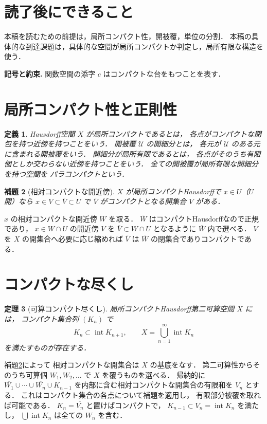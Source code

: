 \documentclass[a5paper,10pt,onecolumn]{jsarticle}
\makeatletter
\theoremstyle{mathnotetheorem}
\newtheorem{theorem}{定理}[section]
\newtheorem{definition}[theorem]{定義}
\newtheorem{lemma}[theorem]{補題}
\renewcommand{\proofname}{証明}
\renewenvironment{proof}[1][\proofname]{%
  \par\pushQED{\qed}\normalfont\topsep4\p@\@plus2\p@\relax
  \trivlist\item[\hskip\labelsep\bfseries #1]\ignorespaces
}{\popQED\endtrivlist\@endpefalse}
\makeatother
\begin{document}
\section*{読了後にできること}
本稿を読むための前提は，局所コンパクト性，開被覆，単位の分割．
本稿の具体的な到達課題は，具体的な空間が局所コンパクトか判定し，局所有限な構造を使う．



\par\noindent\textbf{記号と約束.}\quad
関数空間の添字 $c$ はコンパクトな台をもつことを表す．
\par

\section{局所コンパクト性と正則性}
\begin{definition}
Hausdorff空間 $X$ が局所コンパクトであるとは，
各点がコンパクトな閉包を持つ近傍を持つことをいう．
開被覆 $\mathcal U$ の開細分とは，
各元が $\mathcal U$ のある元に含まれる開被覆をいう．
開細分が局所有限であるとは，
各点がそのうち有限個としか交わらない近傍を持つことをいう．
全ての開被覆が局所有限な開細分を持つ空間を
パラコンパクトという．
\end{definition}
\begin{lemma}[相対コンパクトな開近傍]\label{lem:relcompact}
$X$ が局所コンパクトHausdorffで
$x\in U$（$U$ 開）なら
$x\in V\subset\overline V\subset U$ で
$\overline V$ がコンパクトとなる開集合 $V$ がある．
\end{lemma}
\begin{proof}
$x$ の相対コンパクトな開近傍 $W$ を取る．
$\overline W$ はコンパクトHausdorffなので正規であり，
$x\in W\cap U$ の開近傍 $V$ を
$\overline V\subset W\cap U$ となるように
$\overline W$ 内で選べる．
$V$ を $X$ の開集合へ必要に応じ縮めれば
$\overline V$ は $\overline W$ の閉集合でありコンパクトである．
\end{proof}
\section{コンパクトな尽くし}
\begin{theorem}[可算コンパクト尽くし]\label{thm:exhaust}
局所コンパクトHausdorff第二可算空間 $X$ には，
コンパクト集合列 $(K_n)$ で
\[
 K_n\subset\operatorname{int}K_{n+1},\qquad
 X=\bigcup_{n=1}^\infty\operatorname{int}K_n
\]
を満たすものが存在する．
\end{theorem}
\begin{proof}
補題\ref{lem:relcompact}によって
相対コンパクトな開集合は $X$ の基底をなす．
第二可算性からそのうち可算個
$W_1,W_2,\dots$ で $X$ を覆うものを選べる．
帰納的に
$\overline{W_1}\cup\cdots\cup\overline{W_n}
 \cup K_{n-1}$
を内部に含む相対コンパクトな開集合の有限和を $V_n$ とする．
これはコンパクト集合の各点について補題を適用し，
有限部分被覆を取れば可能である．
$K_n=\overline{V_n}$ と置けばコンパクトで，
$K_{n-1}\subset V_n=\operatorname{int}K_n$ を満たし，
$\bigcup\operatorname{int}K_n$ は全ての $W_n$ を含む．
\end{proof}
\end{document}
